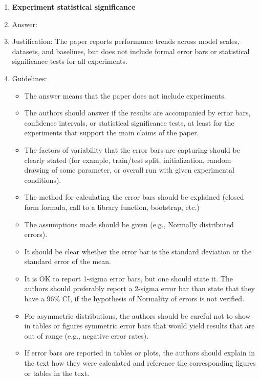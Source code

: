 \documentclass{article}
\begin{document}
\begin{enumerate}
\item {\bf Experiment statistical significance}
    \item[] Answer: \answerNo{}
    \item[] Justification: The paper reports performance trends across model scales, datasets, and baselines, but does not include formal error bars or statistical significance tests for all experiments.
    \item[] Guidelines:
    \begin{itemize}
        \item The answer \answerNA{} means that the paper does not include experiments.
        \item The authors should answer \answerYes{} if the results are accompanied by error bars, confidence intervals, or statistical significance tests, at least for the experiments that support the main claims of the paper.
        \item The factors of variability that the error bars are capturing should be clearly stated (for example, train/test split, initialization, random drawing of some parameter, or overall run with given experimental conditions).
        \item The method for calculating the error bars should be explained (closed form formula, call to a library function, bootstrap, etc.)
        \item The assumptions made should be given (e.g., Normally distributed errors).
        \item It should be clear whether the error bar is the standard deviation or the standard error of the mean.
        \item It is OK to report 1-sigma error bars, but one should state it. The authors should preferably report a 2-sigma error bar than state that they have a 96\% CI, if the hypothesis of Normality of errors is not verified.
        \item For asymmetric distributions, the authors should be careful not to show in tables or figures symmetric error bars that would yield results that are out of range (e.g., negative error rates).
        \item If error bars are reported in tables or plots, the authors should explain in the text how they were calculated and reference the corresponding figures or tables in the text.
    \end{itemize}


\end{enumerate}
\end{document}
